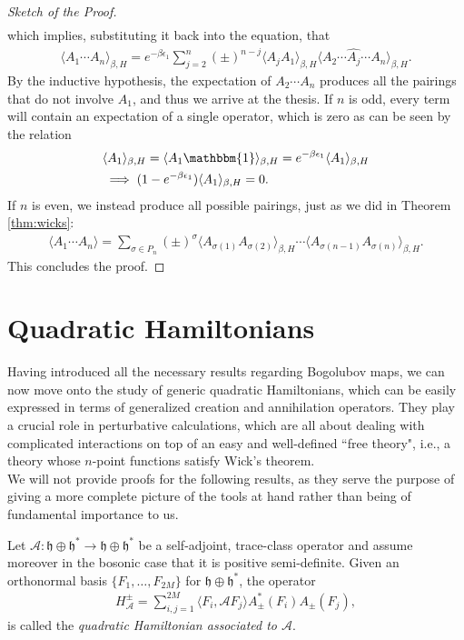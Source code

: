 \begin{proof}[Sketch of the Proof]
\begin{align*}
	\end{align*}
	which implies, substituting it back into the equation, that
	\begin{align*}
		\langle A_1\cdots A_n\rangle_{\beta,H}
		= e^{-\beta\epsilon_1}\sum_{j=2}^n(\pm)^{n-j}\langle A_jA_1\rangle_{\beta,H}
		\langle A_2\cdots\widehat{A_j}\cdots A_n\rangle_{\beta,H}.
	\end{align*}
	By the inductive hypothesis, the expectation of $A_2\cdots A_n$ produces all the pairings
	that do not involve $A_1$, and thus we arrive at the thesis. If $n$ is odd, every term
	will contain an expectation of a single operator, which is zero as can be seen by the
	relation
	\begin{align*}
		&\langle A_1\rangle_{\beta,H} = \langle A_1\mathbbm{1}\rangle_{\beta,H}
		= e^{-\beta\epsilon_1}\langle A_1\rangle_{\beta,H}\\
		&\implies (1-e^{-\beta\epsilon_1})\langle A_1\rangle_{\beta,H} = 0.
	\end{align*}
	If $n$ is even, we instead produce all possible pairings, just as we did in Theorem
	\ref{thm:wicks}:
	\begin{align*}
		\langle A_1\cdots A_n\rangle = \sum_{\sigma\in P_n}(\pm)^\sigma
		\langle A_{\sigma(1)}A_{\sigma(2)}\rangle_{\beta,H}\cdots\langle A_{\sigma(n-1)}A_{\sigma(n)}\rangle_{\beta,H}.
	\end{align*}
	This concludes the proof.
\end{proof}

\section{Quadratic Hamiltonians}

Having introduced all the necessary results regarding Bogolubov maps, we can now move onto
the study of generic quadratic Hamiltonians, which can be easily expressed in terms of
generalized creation and annihilation operators.
They play a crucial role in perturbative calculations, which are all about dealing with
complicated interactions on top of an easy and well-defined ``free theory", i.e., a theory
whose $n$-point functions satisfy Wick's theorem.
\\
We will not provide proofs for the following results, as they serve the purpose of giving a
more complete picture of the tools at hand rather than being of fundamental importance to us.

\begin{definition}
	Let $\mathcal{A}:\mathfrak{h}\oplus\mathfrak{h}^*\to\mathfrak{h}\oplus\mathfrak{h}^*$ be a
	self-adjoint, trace-class operator and assume moreover in the bosonic case that it is
	positive semi-definite. Given an orthonormal basis $\{F_1,\ldots,F_{2M}\}$ for
	$\mathfrak{h}\oplus\mathfrak{h}^*$, the operator
	\begin{align*}
		H_{\mathcal{A}}^\pm = \sum_{i,j=1}^{2M} \langle F_i,\mathcal{A}F_j\rangle A^*_\pm(F_i)A_\pm(F_j),
	\end{align*}
	is called the \textit{quadratic Hamiltonian associated to $\mathcal{A}$}.
\end{definition}

